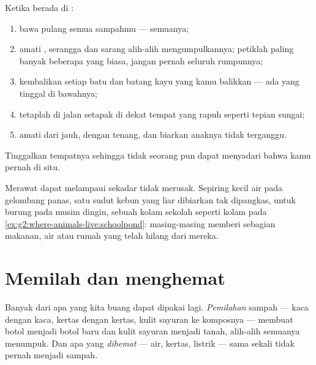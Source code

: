 \begin{method}\label{met:g2:caring-for-nature:rules}
Ketika berada di :
\begin{enumerate}
  \item bawa pulang semua sampahmu --- semuanya;
  \item amati , serangga dan sarang alih-alih mengumpulkannya;
        petiklah paling banyak beberapa  yang biasa, jangan
        pernah seluruh rumpunnya;
  \item kembalikan setiap batu dan batang kayu yang kamu balikkan ---
        ada yang tinggal di bawahnya;
  \item tetaplah di jalan setapak di dekat tempat yang rapuh seperti
        tepian sungai;
  \item amati  dari jauh, dengan tenang, dan biarkan anaknya
        tidak terganggu.
\end{enumerate}
Tinggalkan tempatnya sehingga tidak seorang pun dapat menyadari bahwa
kamu pernah di situ.
\end{method}

\begin{example}\label{ex:g2:caring-for-nature:help}
Merawat dapat melampaui sekadar tidak merusak. Sepiring kecil air pada
gelombang panas, satu sudut kebun yang liar dibiarkan tak dipangkas,
 untuk burung pada musim dingin, sebuah kolam sekolah seperti
kolam pada \cref{ex:g2:where-animals-live:schoolpond}: masing-masing
memberi sebagian  makanan, air atau rumah yang telah
hilang dari mereka.
\end{example}

\section{Memilah dan menghemat}

\begin{proposition}\label{prop:g2:caring-for-nature:recycle}
Banyak dari apa yang kita buang dapat dipakai lagi.
\emph{Pemilahan} sampah --- kaca dengan kaca,
kertas dengan kertas, kulit sayuran ke komposnya --- membuat botol
menjadi botol baru dan kulit sayuran menjadi tanah, alih-alih semuanya
menumpuk. Dan apa yang \emph{dihemat} --- air, kertas, listrik ---
sama sekali tidak pernah menjadi sampah.
\end{proposition}
\admitted


